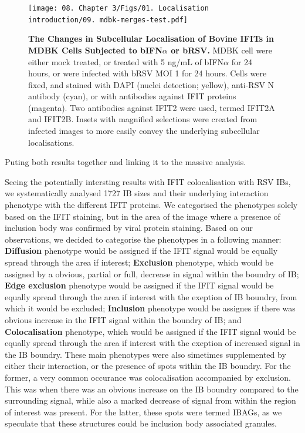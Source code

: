 \begin{figure}
    \centering
    \texttt{[image: 08. Chapter 3/Figs/01. Localisation introduction/09. mdbk-merges-test.pdf]}
    \caption[The Changes in Subcellular Localisation of Bovine IFITs in MDBK Cells Subjected to bIFN\(\alpha\) or bRSV.]{\textbf{The Changes in Subcellular Localisation of Bovine IFITs in MDBK Cells Subjected to bIFN\(\alpha\) or bRSV.} MDBK cell were either mock treated, or treated with 5 ng/mL of bIFN\(\alpha\) for 24 hours, or were infected with bRSV MOI 1 for 24 hours. Cells were fixed, and stained with DAPI (nuclei detection; yellow), anti-RSV N antibody (cyan), or with antibodies against IFIT proteins (magenta). Two antibodies against IFIT2 were used, termed IFIT2A and IFIT2B. Insets with magnified selections were created from infected images to more easily convey the underlying subcellular localisations.}
    \label{fig:The Changes in Subcellular Localisation of Bovine IFITs in MDBK Cells Subjected to bIFNa or bRSV}
\end{figure}

Puting both results together and linking it to the massive analysis.

Seeing the potentially intersting results with IFIT colocalisation with RSV IBs, we systematically analysed 1727 IB sizes and their underlying interaction phenotype with the different IFIT proteins. We categorised the phenotypes solely based on the IFIT staining, but in the area of the image where a presence of inclusion body was confirmed by viral protein staining. Based on our observations, we decided to categorise the phenotypes in a following manner: \textbf{Diffusion} phenotype would be assigned if the IFIT signal would be equally spread through the area if interest; \textbf{Exclusion} phenotype, which would be assigned by a obvious, partial or full, decrease in signal within the boundry of IB; \textbf{Edge exclusion} phenotype would be assigned if the IFIT signal would be equally spread through the area if interest with the exeption of IB boundry, from which it would be excluded; \textbf{Inclusion} phenotype would be assignes if there was obvious increase in the IFIT signal within the boundry of IB; and \textbf{Colocalisation} phenotype, which would be assigned if the IFIT signal would be equally spread through the area if interest with the exeption of increased signal in the IB boundry. These main phenotypes were also simetimes supplemented by either their interaction, or the presence of spots within the IB boundry. For the former, a very common occurance was colocalisation accompanied by exclusion. This was when there was an obvious increase on the IB boundry compared to the surrounding signal, while also a marked decrease of signal from within the region of interest was present. For the latter, these spots were termed IBAGs, as we speculate that these structures could be inclusion body associated granules.

